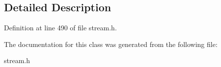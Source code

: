 \subsection{Detailed Description}


Definition at line 490 of file stream.\+h.



The documentation for this class was generated from the following file\+:\begin{DoxyCompactItemize}
\item 
stream.\+h\end{DoxyCompactItemize}
